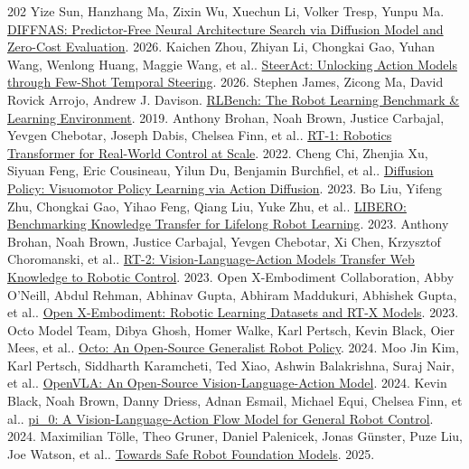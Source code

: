 \begin{thebibliography}{202}
 Yize Sun, Hanzhang Ma, Zixin Wu, Xuechun Li, Volker Tresp, Yunpu Ma. \href{https://arxiv.org/abs/2610.41818v1}{DIFFNAS: Predictor-Free Neural Architecture Search via Diffusion Model and Zero-Cost Evaluation}. 2026.
 Kaichen Zhou, Zhiyan Li, Chongkai Gao, Yuhan Wang, Wenlong Huang, Maggie Wang, et al.. \href{https://arxiv.org/abs/2610.25632v1}{SteerAct: Unlocking Action Models through Few-Shot Temporal Steering}. 2026.
 Stephen James, Zicong Ma, David Rovick Arrojo, Andrew J. Davison. \href{https://arxiv.org/abs/1909.12271v1}{RLBench: The Robot Learning Benchmark \& Learning Environment}. 2019.
 Anthony Brohan, Noah Brown, Justice Carbajal, Yevgen Chebotar, Joseph Dabis, Chelsea Finn, et al.. \href{https://arxiv.org/abs/2212.06817v2}{RT-1: Robotics Transformer for Real-World Control at Scale}. 2022.
 Cheng Chi, Zhenjia Xu, Siyuan Feng, Eric Cousineau, Yilun Du, Benjamin Burchfiel, et al.. \href{https://arxiv.org/abs/2303.04137}{Diffusion Policy: Visuomotor Policy Learning via Action Diffusion}. 2023.
 Bo Liu, Yifeng Zhu, Chongkai Gao, Yihao Feng, Qiang Liu, Yuke Zhu, et al.. \href{https://arxiv.org/abs/2306.03310}{LIBERO: Benchmarking Knowledge Transfer for Lifelong Robot Learning}. 2023.
 Anthony Brohan, Noah Brown, Justice Carbajal, Yevgen Chebotar, Xi Chen, Krzysztof Choromanski, et al.. \href{https://arxiv.org/abs/2307.15818v1}{RT-2: Vision-Language-Action Models Transfer Web Knowledge to Robotic Control}. 2023.
 Open X-Embodiment Collaboration, Abby O'Neill, Abdul Rehman, Abhinav Gupta, Abhiram Maddukuri, Abhishek Gupta, et al.. \href{https://arxiv.org/abs/2310.08864v9}{Open X-Embodiment: Robotic Learning Datasets and RT-X Models}. 2023.
  Octo Model Team, Dibya Ghosh, Homer Walke, Karl Pertsch, Kevin Black, Oier Mees, et al.. \href{https://arxiv.org/abs/2405.12213v2}{Octo: An Open-Source Generalist Robot Policy}. 2024.
 Moo Jin Kim, Karl Pertsch, Siddharth Karamcheti, Ted Xiao, Ashwin Balakrishna, Suraj Nair, et al.. \href{https://arxiv.org/abs/2406.09246}{OpenVLA: An Open-Source Vision-Language-Action Model}. 2024.
 Kevin Black, Noah Brown, Danny Driess, Adnan Esmail, Michael Equi, Chelsea Finn, et al.. \href{https://arxiv.org/abs/2410.24164}{pi\_0: A Vision-Language-Action Flow Model for General Robot Control}. 2024.
 Maximilian Tölle, Theo Gruner, Daniel Palenicek, Jonas Günster, Puze Liu, Joe Watson, et al.. \href{https://arxiv.org/abs/2503.07404v1}{Towards Safe Robot Foundation Models}. 2025.

\end{thebibliography}
